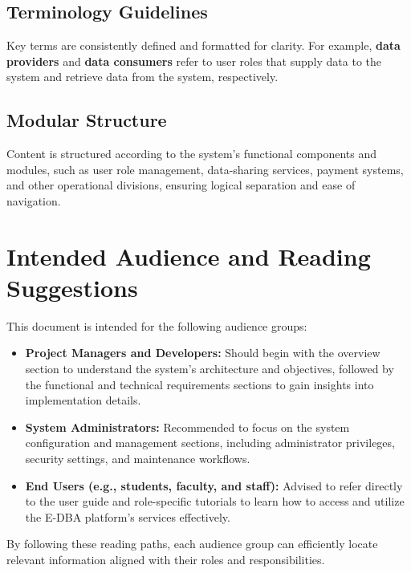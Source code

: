 \subsection{Terminology Guidelines}
Key terms are consistently defined and formatted for clarity. For example, \textbf{data providers} and \textbf{data consumers} refer to user roles that supply data to the system and retrieve data from the system, respectively.

\subsection{Modular Structure}
Content is structured according to the system’s functional components and modules, such as user role management, data-sharing services, payment systems, and other operational divisions, ensuring logical separation and ease of navigation.

\section{Intended Audience and Reading Suggestions}

This document is intended for the following audience groups:

\begin{itemize}
    \item \textbf{Project Managers and Developers:}  
    Should begin with the overview section to understand the system’s architecture and objectives, followed by the functional and technical requirements sections to gain insights into implementation details.  
    \item \textbf{System Administrators:}  
    Recommended to focus on the system configuration and management sections, including administrator privileges, security settings, and maintenance workflows.  
    \item \textbf{End Users (e.g., students, faculty, and staff):}  
    Advised to refer directly to the user guide and role-specific tutorials to learn how to access and utilize the E-DBA platform’s services effectively.  
\end{itemize}

By following these reading paths, each audience group can efficiently locate relevant information aligned with their roles and responsibilities.

